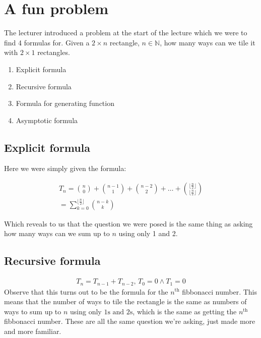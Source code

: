 \documentclass{article}
\begin{document}
\section{A fun problem}
The lecturer introduced a problem at the start of the lecture which we were to find 4 formulas for. 
Given a \(2 \times n \) rectangle, \(n \in \mathbb{N}\), how many ways can we tile it with \(2 \times 1\) rectangles.
\begin{enumerate}
  \item Explicit formula 
  \item Recursive formula 
  \item Formula for generating function
  \item Asymptotic formula
\end{enumerate}

\subsection{Explicit formula}
Here we were simply given the formula: 

\begin{gather*}
  T_n = \binom{n}{0} + \binom{n-1}{1} + \binom{n-2}{2} 
    + \dots + \binom{\lfloor \frac{n}{2} \rfloor}{\lfloor \frac{n}{2} \rfloor}  \\
  = \sum_{k = 0}^{\lfloor \frac{n}{2} \rfloor} \binom{n-k}{k}
\end{gather*}

\noindent Which reveals to us that the question we were posed is the same thing as asking how many ways can we sum up to \(n\) using only 1 and 2.

\subsection{Recursive formula}
\begin{gather*}
  T_n = T_{n-1} + T_{n-2} \text{, } T_0 = 0 \land T_1 = 0 
\end{gather*}
Observe that this turns out to be the formula for the $n^{\text{th}}$ fibbonacci number.
This means that the number of ways to tile the rectangle is the same as numbers of ways to sum up to $n$ using only $1\text{s and } 2\text{s}$, which is the same as getting the $n^{\text{th}}$ fibbonacci number. 
These are all the same question we're asking, just made more and more familiar.
\end{document}

